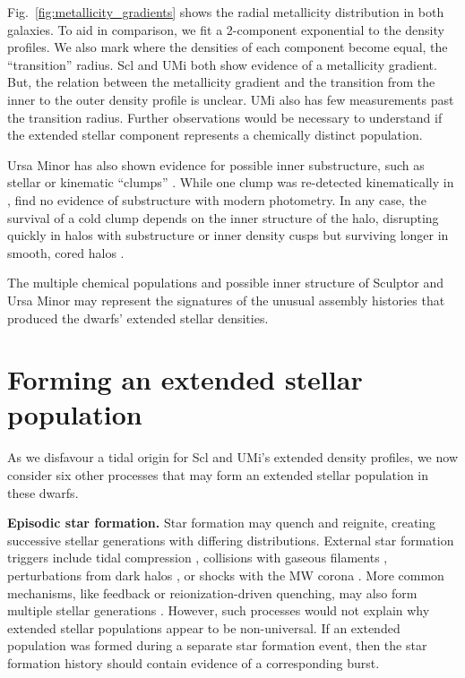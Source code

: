 Fig.~\ref{fig:metallicity_gradients} shows the radial metallicity
distribution in both galaxies. To aid in comparison, we fit a
2-component exponential to the density profiles. We also mark where the
densities of each component become equal, the ``transition'' radius. Scl
and UMi both show evidence of a metallicity gradient. But, the relation
between the metallicity gradient and the transition from the inner to
the outer density profile is unclear. UMi also has few measurements past
the transition radius. Further observations would be necessary to
understand if the extended stellar component represents a chemically
distinct population.

Ursa Minor has also shown evidence for possible inner substructure, such
as stellar or kinematic ``clumps''
\citep[e.g.,][]{olszewski+aaronson1985, demers+1995, kleyna+1998, battinelli+demers1999, bellazzini+2002}.
While one clump was re-detected kinematically in \citet{pace+2014},
\citet{munoz+2018} find no evidence of substructure with modern
photometry. In any case, the survival of a cold clump depends on the
inner structure of the halo, disrupting quickly in halos with
substructure or inner density cusps but surviving longer in smooth,
cored halos \citep{kleyna+2003, lora+2012}.

The multiple chemical populations and possible inner structure of
Sculptor and Ursa Minor may represent the signatures of the unusual
assembly histories that produced the dwarfs' extended stellar densities.

\section{Forming an extended stellar
population}\label{sec:stellar_halos}

As we disfavour a tidal origin for Scl and UMi's extended density
profiles, we now consider six other processes that may form an extended
stellar population in these dwarfs.

\textbf{Episodic star formation.} Star formation may quench and
reignite, creating successive stellar generations with differing
distributions. External star formation triggers include tidal
compression \citep{mayer+2001a, dong+lin+murray2003}, collisions with
gaseous filaments \citep{genina+2019}, perturbations from dark halos
\citep{starkenburg+helmi+sales2016}, or shocks with the MW corona
\citep{wright+2019}. More common mechanisms, like feedback or
reionization-driven quenching, may also form multiple stellar
generations
\citep{kawata+2006, benitez-llambay+2015, revaz+jablonka2018}. However,
such processes would not explain why extended stellar populations appear
to be non-universal. If an extended population was formed during a
separate star formation event, then the star formation history should
contain evidence of a corresponding burst.

